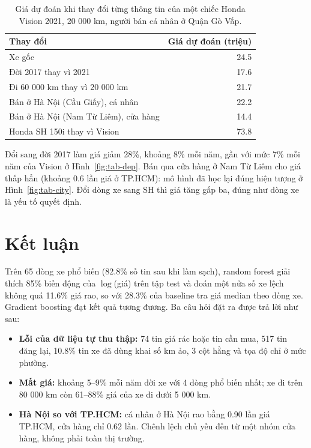 \begin{table}[H]\centering
\caption{Giá dự đoán khi thay đổi từng thông tin của một chiếc Honda Vision 2021, 20 000 km, người bán cá nhân ở Quận Gò
Vấp.}\label{tab:tab-cases}
\begin{tabular}{lr}
\toprule
Thay đổi & Giá dự đoán (triệu) \\
\midrule
Xe gốc & 24.5 \\
Đời 2017 thay vì 2021 & 17.6 \\
Đi 60 000 km thay vì 20 000 km & 21.7 \\
Bán ở Hà Nội (Cầu Giấy), cá nhân & 22.2 \\
Bán ở Hà Nội (Nam Từ Liêm), cửa hàng & 14.4 \\
Honda SH 150i thay vì Vision & 73.8 \\
\bottomrule
\end{tabular}
\end{table}

Đổi sang đời 2017 làm giá giảm 28\%, khoảng 8\% mỗi năm, gần với mức 7\% mỗi năm của Vision ở
Hình~\ref{fig:tab-dep}. Bán qua cửa hàng ở Nam Từ Liêm cho giá thấp hẳn (khoảng 0.6 lần giá ở TP.HCM): mô hình đã học
lại đúng hiện tượng ở Hình~\ref{fig:tab-city}. Đổi dòng xe sang SH thì giá tăng gấp ba, đúng như dòng xe là yếu tố quyết
định.

\section{Kết luận}

Trên 65 dòng xe phổ biến (82.8\% số tin sau khi làm sạch), random forest giải thích 85\% biến động của $\log$(giá) trên
tập test và đoán một nửa số xe lệch không quá 11.6\% giá rao, so với 28.3\% của baseline tra giá median theo dòng xe.
Gradient boosting đạt kết quả tương đương. Ba câu hỏi đặt ra được trả lời như sau:

\begin{itemize}
  \item \textbf{Lỗi của dữ liệu tự thu thập:} 74 tin giá rác hoặc tin cần mua, 517 tin đăng lại, 10.8\% tin xe đã dùng
        khai số km ảo, 3 cột hằng và tọa độ chỉ ở mức phường.
  \item \textbf{Mất giá:} khoảng 5--9\% mỗi năm đời xe với 4 dòng phổ biến nhất; xe đi trên 80 000 km còn 61--88\% giá
        của xe đi dưới 5 000 km.
  \item \textbf{Hà Nội so với TP.HCM:} cá nhân ở Hà Nội rao bằng 0.90 lần giá TP.HCM, cửa hàng chỉ 0.62 lần. Chênh lệch
        chủ yếu đến từ một nhóm cửa hàng, không phải toàn thị trường.
\end{itemize}

